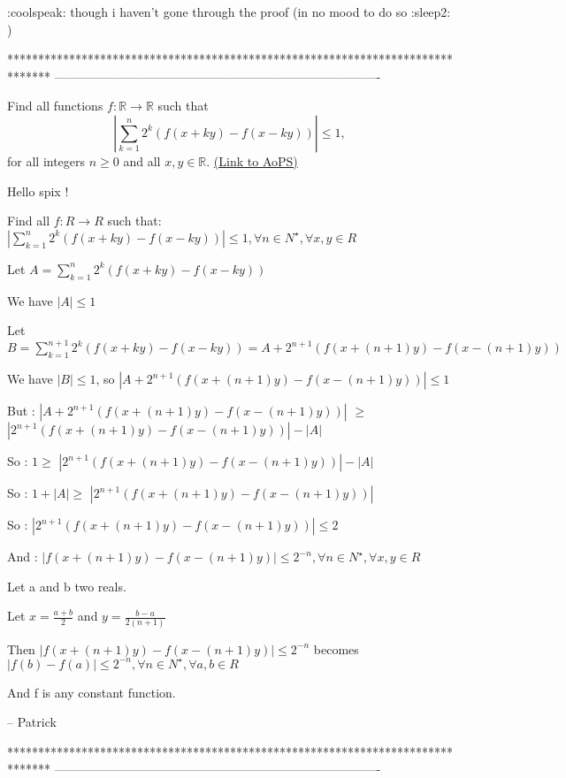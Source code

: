 \begin{mysolution}
	:coolspeak: though i haven't gone through the proof (in no mood to do so :sleep2: )
\end{mysolution}


*******************************************************************************
-------------------------------------------------------------------------------

\begin{problem}
	Find all functions $f: \mathbb R\to \mathbb R$ such that
\[\left | \sum_{k=1}^{n}2^{k}(f(x+ky)-f(x-ky)) \right |\leq 1 ,\]
 for all integers $n \geq 0$ and all $x,y \in \mathbb R$.
	\flushright \href{https://artofproblemsolving.com/community/c6h145321}{(Link to AoPS)}
\end{problem}



\begin{mysolution}
	Hello spix !
\begin{tcolorbox}Find all $f: R\to R$ such that:
 $\left | \sum_{k=1}^{n}2^{k}(f(x+ky)-f(x-ky)) \right |\leq 1 , \forall n \in N^{\star}, \forall x,y \in R$\end{tcolorbox}

Let $A= \sum_{k=1}^{n}2^{k}(f(x+ky)-f(x-ky))$

We have $\left | A \right |\leq 1$

Let $B= \sum_{k=1}^{n+1}2^{k}(f(x+ky)-f(x-ky)) = A+2^{n+1}(f(x+(n+1)y)-f(x-(n+1)y))$

We have $\left | B \right |\leq 1$, so $\left | A+2^{n+1}(f(x+(n+1)y)-f(x-(n+1)y)) \right |\leq 1$

But : $\left | A+2^{n+1}(f(x+(n+1)y)-f(x-(n+1)y)) \right |$ $\geq$ $\left | 2^{n+1}(f(x+(n+1)y)-f(x-(n+1)y)) \right |-\left | A\right |$

So : $1 \geq$ $\left | 2^{n+1}(f(x+(n+1)y)-f(x-(n+1)y)) \right |-\left | A\right |$

So : $1+\left | A\right |\geq$ $\left | 2^{n+1}(f(x+(n+1)y)-f(x-(n+1)y)) \right |$

So : $\left | 2^{n+1}(f(x+(n+1)y)-f(x-(n+1)y)) \right | \leq 2$

And : $\left | f(x+(n+1)y)-f(x-(n+1)y) \right | \leq 2^{-n}, \forall n \in N^{\star}, \forall x,y \in R$

Let a and b two reals.

Let $x=\frac{a+b}{2}$ and $y=\frac{b-a}{2(n+1)}$ 

Then $\left | f(x+(n+1)y)-f(x-(n+1)y) \right | \leq 2^{-n}$ becomes $\left | f(b)-f(a) \right | \leq 2^{-n}, \forall n \in N^{\star}, \forall a,b \in R$

And f is any constant function.

-- 
Patrick
\end{mysolution}
*******************************************************************************
-------------------------------------------------------------------------------

